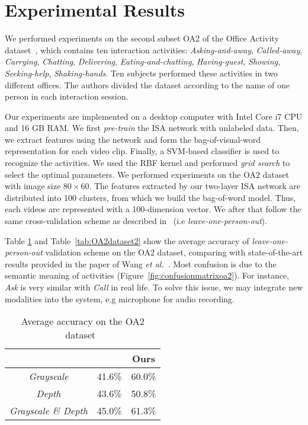 \documentclass{article}
\begin{document}
\section{Experimental Results}
\label{sec:results}

We performed experiments on the second subset OA2 of the Office Activity dataset~\cite{2014_Wang_ConvolutionalNetworks}, which contains ten interaction activities: \textit{Asking-and-away}, \textit{Called-away}, \textit{Carrying}, \textit{Chatting}, \textit{Delivering}, \textit{Eating-and-chatting}, \textit{Having-guest}, \textit{Showing}, \textit{Seeking-help}, \textit{Shaking-hands}.
Ten subjects performed these activities in two different offices.
The authors divided the dataset according to the name of one person in each interaction session.

Our experiments are implemented on a desktop computer with Intel Core i7 CPU and 16 GB RAM.
We first \textit{pre-train} the ISA network with unlabeled data.
Then, we extract features using the network and form the bag-of-visual-word representation for each video clip.
Finally, a SVM-based classifier is used to recognize the activities.
We used the RBF kernel and performed \textit{grid search} to select the optimal parameters.
We performed experiments on the OA2 dataset~\cite{2014_Wang_ConvolutionalNetworks} with image size $80\times60$.
The features extracted by our two-layer ISA network are distributed into 100 clusters, from which we build the bag-of-word model.
Thus, each videos are represented with a 100-dimension vector.
We after that follow the same cross-validation scheme as described in~\cite{2014_Wang_ConvolutionalNetworks} (i.e \textit{leave-one-person-out}).

Table \ref{tab:OA2dataset} and Table~\ref{tab:OA2dataset2} show the average accuracy of \textit{leave-one-person-out} validation scheme on the OA2 dataset, comparing with state-of-the-art results provided in the paper of Wang \textit{et al.}~\cite{2014_Wang_ConvolutionalNetworks}.
Most confusion is due to the semantic meaning of activities (Figure~\ref{fig:confusionmatrixoa2}).
For instance, \textit{Ask} is very similar with \textit{Call} in real life.
To solve this issue, we may integrate new modalities into the system, e.g microphone for audio recording.

\begin{table}[t]
	\begin{center}
	\caption{Average accuracy on the OA2 dataset~ \cite{2014_Wang_ConvolutionalNetworks}}
	\label{tab:OA2dataset}
	\begin{tabular}{|c|c|c|}
  		\hline
  		\textbf{} & \cite{2014_Wang_ConvolutionalNetworks} & Ours
  		\\
  		\hline
  		\textit{Grayscale} & 41.6\% & 60.0\% \\
  		\hline
  		\textit{Depth} & 43.6\% & 50.8\% \\
  		\hline
  		\textit{Grayscale \& Depth} & 45.0\% & 61.3\% \\
  		\hline
\end{tabular}
\end{center}
\end{table}
\end{document}
